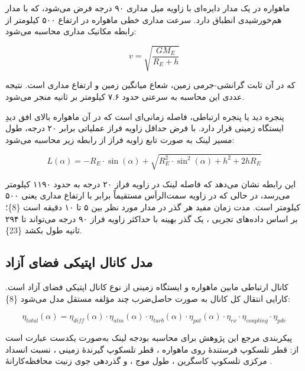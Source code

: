 \documentclass[a4paper,14pt]{extreport}
\begin{document}
ماهواره در یک مدار دایره‌ای با زاویه میل مداری  ۹۰ درجه فرض می‌شود، که با مدار هم‌خورشیدی  انطباق دارد. سرعت مداری خطی ماهواره در ارتفاع ۵۰۰ کیلومتر از رابطه مکانیک مداری محاسبه می‌شود:

\begin{equation}
v = \sqrt{\frac{GM_E}{R_E + h}}
\label{eq:orbital_velocity}
\end{equation}

که در آن  ثابت گرانشی-جرمی زمین،  شعاع میانگین زمین و  ارتفاع مداری است. نتیجه عددی این محاسبه به سرعتی حدود ۷.۶ کیلومتر بر ثانیه منجر می‌شود.

پنجره دید  یا پنجره ارتباطی، فاصله زمانی‌ای است که در آن ماهواره بالای افق دیدِ ایستگاه زمینی قرار دارد. با فرض حداقل زاویه فراز  عملیاتی برابر ۲۰ درجه، طول مسیر لینک به صورت تابع زاویه فراز از رابطه زیر محاسبه می‌شود:

\begin{equation}
L(\alpha) = -R_E \cdot \sin(\alpha) + \sqrt{R_E^2 \cdot \sin^2(\alpha) + h^2 + 2hR_E}
\label{eq:link_length}
\end{equation}

این رابطه نشان می‌دهد که فاصله لینک در زاویه فراز ۲۰ درجه به حدود ۱۱۹۰ کیلومتر می‌رسد، در حالی که در زاویه سمت‌الرأس  مستقیماً برابر با ارتفاع مداری یعنی ۵۰۰ کیلومتر است. مدت زمان مفید هر گذر  در مدار مورد نظر بین ۵ تا ۱۰ دقیقه است \{8\}؛ بر اساس داده‌های تجربی ، یک گذر بهینه با حداکثر زاویه فراز ۹۰ درجه می‌تواند تا ۲۹۴ ثانیه طول بکشد \{23\}.

\subsection{مدل کانال اپتیکی فضای آزاد}

کانال ارتباطی مابین ماهواره  و ایستگاه زمینی از نوع کانال اپتیکی فضای آزاد  است. کارایی انتقال کل کانال  به صورت حاصل‌ضرب چند مؤلفه مستقل مدل می‌شود \{8\}:

\begin{equation}
\eta_{total}(\alpha) = \eta_{diff}(\alpha) \cdot \eta_{atm}(\alpha) \cdot \eta_{turb}(\alpha) \cdot \eta_{pat}(\alpha) \cdot \eta_{rx} \cdot \eta_{coupling} \cdot \eta_{pde}
\label{eq:total_eta}
\end{equation}

پیکربندی مرجع این پژوهش برای محاسبه بودجه لینک به‌صورت یکدست عبارت است از: قطر تلسکوپ فرستندهٔ روی ماهواره ، قطر تلسکوپ گیرندهٔ زمینی ، نسبت انسداد مرکزی تلسکوپ کاسگرین ، طول موج ، و گذردهی جوی زنیت محافظه‌کارانهٔ .
\end{document}
